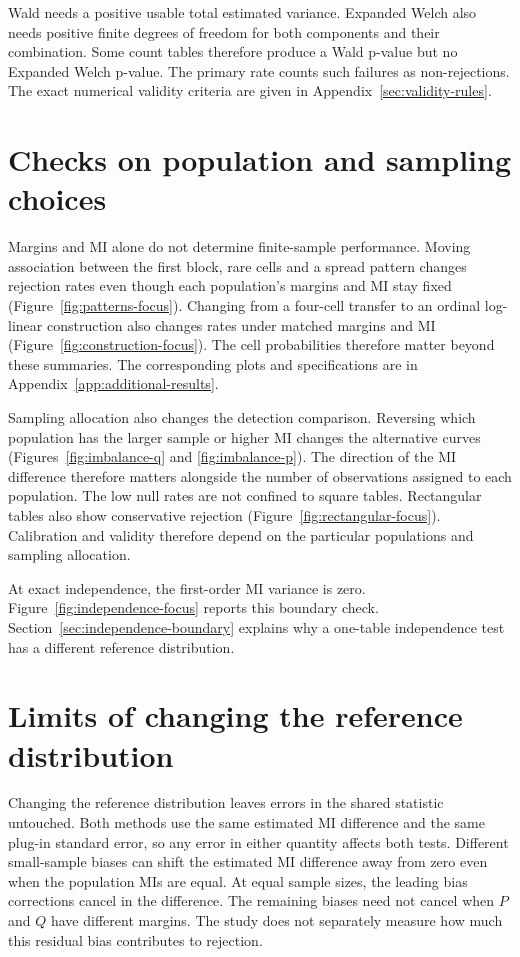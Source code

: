 \FloatBarrier

Wald needs a positive usable total estimated variance. Expanded Welch also
needs positive finite degrees of freedom for both components and their
combination. Some count tables therefore
produce a Wald p-value but no Expanded Welch p-value. The primary
rate counts such failures as non-rejections. The exact
numerical validity criteria are given in Appendix~\ref{sec:validity-rules}.

\section{Checks on population and sampling choices}

Margins and MI alone do not determine finite-sample performance.
Moving association between the first block, rare cells and a spread pattern
changes rejection rates even though each population's margins and MI stay
fixed (Figure~\ref{fig:patterns-focus}). Changing from a four-cell transfer
to an ordinal log-linear construction also changes rates under matched
margins and MI (Figure~\ref{fig:construction-focus}). The cell probabilities
therefore matter beyond these summaries. The corresponding plots and
specifications are in Appendix~\ref{app:additional-results}.

Sampling allocation also changes the detection comparison. Reversing which
population has the larger sample or higher MI changes
the alternative curves (Figures~\ref{fig:imbalance-q} and
\ref{fig:imbalance-p}). The direction of the MI difference therefore matters
alongside the number of observations assigned to each population.
The low null rates are not confined to square tables.
Rectangular tables also show conservative rejection
(Figure~\ref{fig:rectangular-focus}). Calibration and validity therefore
depend on the particular populations and sampling allocation.

At exact independence, the first-order MI variance is zero.
Figure~\ref{fig:independence-focus} reports this boundary check.
Section~\ref{sec:independence-boundary} explains why a one-table
independence test has a different reference distribution.

\section{Limits of changing the reference distribution}
\label{sec:mechanism-results}

Changing the reference distribution leaves errors in the shared statistic
untouched. Both methods use the same estimated MI difference and the same
plug-in standard error, so any error in either quantity affects both tests.
Different small-sample biases can shift the estimated MI difference away
from zero even when the population MIs are equal. At equal sample sizes,
the leading bias corrections cancel in the difference. The remaining
biases need not cancel when \(P\) and \(Q\) have different margins.
The study does not separately measure how much this residual bias
contributes to rejection.

